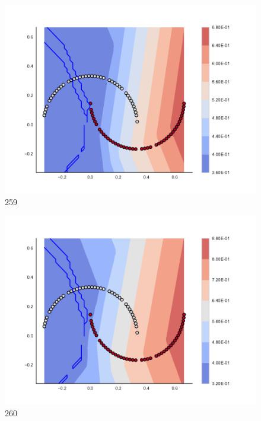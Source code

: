\begin{subfigure}[b]{0.09\textwidth}
    \includegraphics[clip, trim=2.35cm 1.75cm 4.5cm 0cm,width=\textwidth]{img/convergence/259.pdf}
    \caption{259}
    \label{fig:convergence_259}
\end{subfigure}
%
\begin{subfigure}[b]{0.09\textwidth}
    \includegraphics[clip, trim=2.35cm 1.75cm 4.5cm 0cm,width=\textwidth]{img/convergence/260.pdf}
    \caption{260}
    \label{fig:convergence_260}
\end{subfigure}
%
